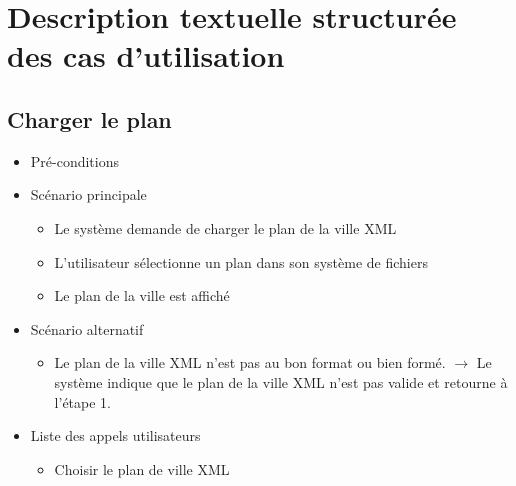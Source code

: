 \documentclass[10pt,a4paper]{book}
\begin{document}
\section{Description textuelle structurée des cas d'utilisation}
\subsection{Charger le plan}
\begin{itemize}
	\item{Pré-conditions}
	\item{Scénario principale}
	\begin{itemize}
		\item{Le système demande de charger le plan de la ville XML}
		\item{L’utilisateur sélectionne un plan dans son système de fichiers}
		\item{Le plan de la ville est affiché}
	\end{itemize}
	\item{Scénario alternatif}
	\begin{itemize}
		\item{Le plan de la ville XML n’est pas au bon format ou bien formé. $\rightarrow$ Le système indique que le plan de la ville XML n’est pas valide et retourne à l’étape 1.}
	\end{itemize}
	\item{Liste des appels utilisateurs}
	\begin{itemize}
		\item{Choisir le plan de ville XML}
	\end{itemize}
\end{itemize}
\end{document}
